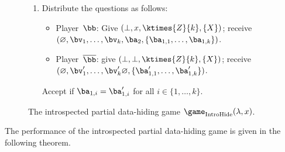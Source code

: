 {\begin{figure}[htbp]
\begin{enumerate}
\begin{itemize}
        $(\varnothing, \bv'_1, \dots, \bv'_k, \varnothing, \{\ba_{1,1}', \dots \ba_{1,k}'\})$. 
        \end{itemize}
        Accept if $\bv_i = \bv'_i$ and $\ba'_{1,i} = \bv_i \cdot \ba_1$ for all $i \in \{1,
        \dots, k\}$.
      \item 
        Distribute the questions as follows:
        \begin{itemize}
          \item[$\circ$] Player~$\bb$: Give $(\bot, x, \ktimes{Z}{k}, \{X\})$;
            receive $(\varnothing, \bv_1, \dots, \bv_k, \ba_2, \{\ba_{1,1}, \dots,
            \ba_{1,k}\})$.
          \item[$\circ$] Player~$\overline{\bb}$: give $(\bot,
            \bot, \ktimes{Z}{k}, \{X\})$; receive $(\varnothing,
            \bv'_1, \dots, \bv'_k
            \varnothing, \{\ba'_{1,1}, \dots, \ba'_{1,k}\})$.
          \end{itemize}
          Accept if $\ba_{1,i}  = \ba_{1,i}'$ for all $i \in \{1,
          \dots, k\}$.
    \end{enumerate}
\caption{The introspected partial data-hiding game $\game_{\mathrm{IntroHide}}(\lambda, x)$.\label{fig:ihide}}
\end{figure}
}

The performance of the introspected partial data-hiding game is given in the following theorem.


